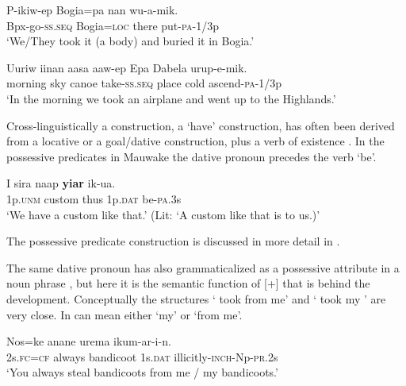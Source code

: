 \ea%
\label{ex:3:x1802}
\gll P-ikiw-ep Bogia=pa nan wu-a-mik. \\
Bpx-go-\textsc{ss}.\textsc{seq} Bogia=\textsc{loc} there put-\textsc{pa}-1/3p\\
\glt`We/They took it (a body) and buried it in Bogia.'
\z

\ea%
\label{ex:3:x1800}
\gll Uuriw iinan aasa aaw-ep Epa Dabela urup-e-mik. \\
morning sky canoe take-\textsc{ss}.\textsc{seq} place cold ascend-\textsc{pa}-1/3p\\
\glt`In the morning we took an airplane and went up to the Highlands.'
\z

Cross-linguistically a  construction, a `have' construction, has often been derived from a locative or a goal/dative construction, plus a verb of existence \citep[50--61]{Heine1997}. In the possessive predicates in Mauwake the dative pronoun precedes the verb \textstyleStyleVernacularWordsItalic{-} `be'. 

\ea%
\label{ex:3:x1788}
\gll I sira naap \textbf{yiar} ik-ua. \\
1p.\textsc{unm} custom thus 1p.\textsc{dat} be-\textsc{pa}.3s\\
\glt`We have a custom like that.' (Lit: `A custom like that is to us.)'
\z

The possessive predicate construction is discussed in more detail in . 

The same dative pronoun has also grammaticalized as a possessive attribute in a noun phrase , but here it is the semantic function of [+]  that is behind the development. Conceptually the structures ` took  from me' and ` took my ' are very close. In   can mean either `my' or `from me'. 

\ea%
\label{ex:3:x581}
\gll Nos=ke anane urema  ikum-ar-i-n. \\
2s.\textsc{fc}=\textsc{cf} always bandicoot 1s.\textsc{dat} illicitly-\textsc{inch}-Np-\textsc{pr}.2s\\
\glt`You always steal bandicoots from me / my bandicoots.'
\z

